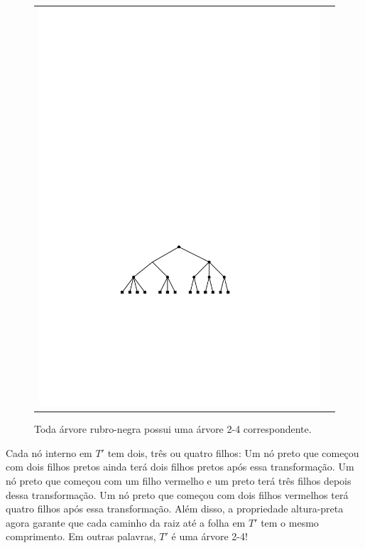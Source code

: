 \begin{figure}
\begin{center}
\begin{tabular}{cc}
			\includegraphics[scale=0.90909]{figs/24rb-2}
		\end{tabular}
	\end{center}
	\caption{Toda árvore rubro-negra possui uma árvore 2-4 correspondente.}
\end{figure}

Cada nó interno em $T'$ tem dois, três ou quatro filhos: Um nó preto
que começou com dois filhos pretos ainda terá dois
filhos pretos após essa transformação. Um nó preto que começou
com um filho vermelho e um preto terá três filhos depois dessa
transformação. Um nó preto que começou com dois filhos vermelhos
terá quatro filhos após essa transformação. Além disso, a
propriedade altura-preta agora garante que cada caminho da raiz até a folha em $T'$ tem o mesmo comprimento. Em outras palavras, $T'$ é uma árvore 2-4!

